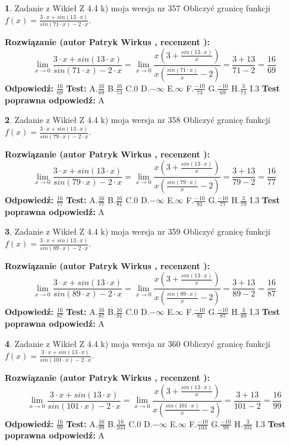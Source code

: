 \documentclass[12pt, a4paper]{article}
\theoremstyle{definition} %
\newtheorem{zad}{}
\newcommand{\zadStart}[1]{\begin{zad}#1\newline}
\newcommand{\zadStop}{\end{zad}}
\newcommand{\rozwStart}[2]{\noindent \textbf{Rozwiązanie (autor #1 , recenzent #2): }\newline}
\newcommand{\rozwStop}{\newline}
\newcommand{\odpStart}{\noindent \textbf{Odpowiedź:}\newline}
\newcommand{\odpStop}{\newline}
\newcommand{\testStart}{\noindent \textbf{Test:}\newline}
\newcommand{\testStop}{\newline}
\newcommand{\kluczStart}{\noindent \textbf{Test poprawna odpowiedź:}\newline}
\newcommand{\kluczStop}{\newline}
\begin{document}
\zadStart{Zadanie z Wikieł Z 4.4 k) moja wersja nr 357}
Obliczyć granicę funkcji $f(x)=\frac{3\cdot x +sin(13\cdot x)}{sin(71\cdot x) -2\cdot x}$.
\zadStop
\rozwStart{Patryk Wirkus}{}
$$\lim\limits_{x\to 0}\frac{3\cdot x +sin(13\cdot x)}{sin(71\cdot x) -2\cdot x}
=\lim\limits_{x\to 0}\frac{x(3+\frac{sin(13\cdot x)}{x})}{x(\frac{sin(71\cdot x)}{x}-2)}
=\frac{3+13}{71-2} = \frac{16}{69}$$
\rozwStop
\odpStart
$\frac{16}{69}$
\odpStop
\testStart
A.$\frac{16}{69}$
B.$\frac{16}{73}$
C.$0$
D.$-\infty$
E.$\infty$
F.$\frac{-10}{73}$
G.$\frac{-10}{69}$
H.$\frac{3}{71}$
I.$3$
\testStop
\kluczStart
A
\kluczStop



\zadStart{Zadanie z Wikieł Z 4.4 k) moja wersja nr 358}
Obliczyć granicę funkcji $f(x)=\frac{3\cdot x +sin(13\cdot x)}{sin(79\cdot x) -2\cdot x}$.
\zadStop
\rozwStart{Patryk Wirkus}{}
$$\lim\limits_{x\to 0}\frac{3\cdot x +sin(13\cdot x)}{sin(79\cdot x) -2\cdot x}
=\lim\limits_{x\to 0}\frac{x(3+\frac{sin(13\cdot x)}{x})}{x(\frac{sin(79\cdot x)}{x}-2)}
=\frac{3+13}{79-2} = \frac{16}{77}$$
\rozwStop
\odpStart
$\frac{16}{77}$
\odpStop
\testStart
A.$\frac{16}{77}$
B.$\frac{16}{81}$
C.$0$
D.$-\infty$
E.$\infty$
F.$\frac{-10}{81}$
G.$\frac{-10}{77}$
H.$\frac{3}{79}$
I.$3$
\testStop
\kluczStart
A
\kluczStop



\zadStart{Zadanie z Wikieł Z 4.4 k) moja wersja nr 359}
Obliczyć granicę funkcji $f(x)=\frac{3\cdot x +sin(13\cdot x)}{sin(89\cdot x) -2\cdot x}$.
\zadStop
\rozwStart{Patryk Wirkus}{}
$$\lim\limits_{x\to 0}\frac{3\cdot x +sin(13\cdot x)}{sin(89\cdot x) -2\cdot x}
=\lim\limits_{x\to 0}\frac{x(3+\frac{sin(13\cdot x)}{x})}{x(\frac{sin(89\cdot x)}{x}-2)}
=\frac{3+13}{89-2} = \frac{16}{87}$$
\rozwStop
\odpStart
$\frac{16}{87}$
\odpStop
\testStart
A.$\frac{16}{87}$
B.$\frac{16}{91}$
C.$0$
D.$-\infty$
E.$\infty$
F.$\frac{-10}{91}$
G.$\frac{-10}{87}$
H.$\frac{3}{89}$
I.$3$
\testStop
\kluczStart
A
\kluczStop



\zadStart{Zadanie z Wikieł Z 4.4 k) moja wersja nr 360}
Obliczyć granicę funkcji $f(x)=\frac{3\cdot x +sin(13\cdot x)}{sin(101\cdot x) -2\cdot x}$.
\zadStop
\rozwStart{Patryk Wirkus}{}
$$\lim\limits_{x\to 0}\frac{3\cdot x +sin(13\cdot x)}{sin(101\cdot x) -2\cdot x}
=\lim\limits_{x\to 0}\frac{x(3+\frac{sin(13\cdot x)}{x})}{x(\frac{sin(101\cdot x)}{x}-2)}
=\frac{3+13}{101-2} = \frac{16}{99}$$
\rozwStop
\odpStart
$\frac{16}{99}$
\odpStop
\testStart
A.$\frac{16}{99}$
B.$\frac{16}{103}$
C.$0$
D.$-\infty$
E.$\infty$
F.$\frac{-10}{103}$
G.$\frac{-10}{99}$
H.$\frac{3}{101}$
I.$3$
\testStop
\kluczStart
A
\kluczStop
\end{document}
